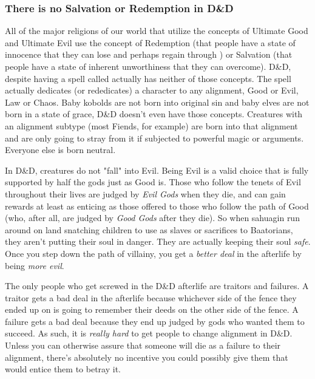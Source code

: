 \subsubsection{There is no Salvation or Redemption in D\&D}
All of the major religions of our world that utilize the concepts of Ultimate Good and Ultimate Evil use the concept of Redemption (that people have a state of innocence that they can lose and perhaps regain through ) or Salvation (that people have a state of inherent unworthiness that they can overcome). D\&D, despite having a spell called  actually has neither of those concepts. The  spell actually dedicates (or rededicates) a character to any alignment, Good or Evil, Law or Chaos. Baby kobolds are not born into original sin and baby elves are not born in a state of grace, D\&D doesn't even have those concepts. Creatures with an alignment subtype (most Fiends, for example) are born into that alignment and are only going to stray from it if subjected to powerful magic or arguments. Everyone else is born neutral.

In D\&D, creatures do not "fall" into Evil. Being Evil is a valid choice that is fully supported by half the gods just as Good is. Those who follow the tenets of Evil throughout their lives are judged by \textit{Evil Gods} when they die, and can gain rewards at least as enticing as those offered to those who follow the path of Good (who, after all, are judged by \textit{Good Gods} after they die). So when sahuagin run around on land snatching children to use as slaves or sacrifices to Baatorians, they aren't putting their soul in danger. They are actually keeping their soul \textit{safe}. Once you step down the path of villainy, you get a \textit{better deal} in the afterlife by being \textit{more evil}.

The only people who get screwed in the D\&D afterlife are traitors and failures. A traitor gets a bad deal in the afterlife because whichever side of the fence they ended up on is going to remember their deeds on the other side of the fence. A failure gets a bad deal because they end up judged by gods who wanted them to succeed. As such, it is \textit{really hard} to get people to change alignment in D\&D. Unless you can otherwise assure that someone will die as a failure to their alignment, there's absolutely no incentive you could possibly give them that would entice them to betray it.

